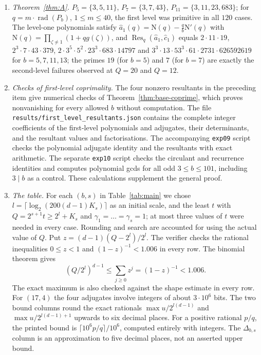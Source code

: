 \documentclass[12pt]{article}
\newcommand{\Res}{\operatorname{Res}}
\newcommand{\rad}{\operatorname{rad}}
\newcommand{\Nm}{\mathrm{N}}
\newcommand{\gpoly}{g}
\begin{document}
\begin{enumerate}[leftmargin=*]
in all $160$ cases. For $3\mid b$ the first level is never primitive: $\varphi_1(\omega)=3q+1$ for both primitive cube
roots of unity $\omega$, so every prime factor of $3q+1$ is exceptional; this is why we assume $3\nmid b$.
\item \emph{Theorem~\ref{thm:A}.} $P_5=\{3,5,11\}$, $P_7=\{3,7,43\}$, $P_{11}=\{3,11,23,683\}$; for $q=m\cdot\rad(P_b)$,
$1\le m\le40$, the first level was primitive in all $120$ cases. The level-one polynomials satisfy
$\hat a_1(q)=\Nm(q)-\frac qb\Nm'(q)$ with $\Nm(q)=\prod_{\zeta\ne1}(1+q\gpoly(\zeta))$, and
$\Res_q(\hat a_1,\hat c_1)$ equals $2\cdot11\cdot19$, $2^3\cdot7\cdot43\cdot379$,
$2\cdot3^5\cdot5^2\cdot23^3\cdot683\cdot14797$ and $3^3\cdot13\cdot53^3\cdot61\cdot2731\cdot626592619$ for $b=5,7,11,13$;
the primes $19$ (for $b=5$) and $7$ (for $b=7$) are exactly the second-level failures observed at $Q=20$ and $Q=12$.
\item \emph{Checks of first-level coprimality.} The four nonzero resultants in the preceding item give numerical
checks of Theorem~\ref{thm:base-coprime}, which proves nonvanishing for every allowed $b$ without computation.
The file \texttt{results/first\_level\_resultants.json} contains the complete integer coefficients of the first-level
polynomials and adjugates, their determinants, and the resultant values and factorisations. The accompanying
\texttt{exp09} script checks the polynomial adjugate identity and the resultants with exact arithmetic.
The separate \texttt{exp10} script checks the circulant and recurrence identities and computes polynomial gcds for
all odd $3\le b\le101$, including $3\mid b$ as a control. These calculations supplement the general proof.
\item \emph{The table.} For each $(b,s)$ in Table~\ref{tab:main} we chose
$l=\lceil\log_2(200(d-1)K_s)\rceil$ as an initial scale, and the least $t$ with
$Q=2^{s+1}t\ge2^l+K_s$ and $\gamma_1=\dots=\gamma_s=1$; at most three values of $t$ were needed in every case.
Rounding and search are accounted for using the actual value of $Q$. Put $z=(d-1)(Q-2^l)/2^l$.
The verifier checks the rational inequalities $0\le z<1$ and $(1-z)^{-1}<1.006$ in every row. The binomial theorem gives
\[
(Q/2^l)^{d-1}\le\sum_{j\ge0}z^j=(1-z)^{-1}<1.006.
\]
The exact maximum is also checked against the shape estimate in every row.
For $(17,4)$ the four adjugates involve integers of about $3\cdot10^6$ bits.
The two bound columns round the exact rationals $\max u/2^{l(d-1)}$ and $\max u/2^{l(d-1)+1}$ upwards to six decimal
places. For a positive rational $p/q$, the printed bound is
$\lceil10^6p/q\rceil/10^6$, computed entirely with integers. The $\Delta_{b,s}$ column is an approximation to five
decimal places, not an asserted upper bound.
\end{enumerate}
\end{document}

